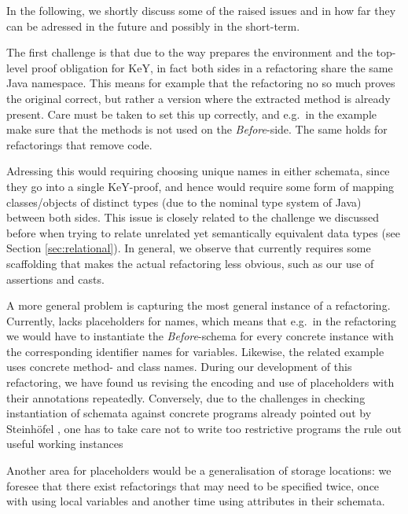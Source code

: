 In the following, we shortly discuss some of the raised issues and in how far they can be adressed in the future and possibly in the short-term.

The first challenge is that due to the way \Refinity{} prepares the environment and the top-level proof obligation for KeY,
in fact both sides in a refactoring share the same Java namespace.
This means for example that the  refactoring no so much proves the original correct, but rather a version where the extracted method is already present.
Care must be taken to set this up correctly, and e.g.\ in the  example make sure that the methods is not used on the \textit{Before}-side.
The same holds for refactorings that remove code.

Adressing this would requiring choosing unique names in either schemata, since they go into a single KeY-proof, and hence would require some form of mapping classes/objects of distinct types (due to the nominal type system of Java) between both sides.
This issue is closely related to the challenge we discussed before when trying to relate unrelated yet semantically equivalent data types (see Section \ref{sec:relational}).
In general, we observe that currently \Refinity{} requires some scaffolding that makes the actual refactoring less obvious,
such as our use of assertions and casts.

A more general problem is capturing the most general instance of a refactoring.
Currently, \Refinity{} lacks placeholders for names, which means that e.g.\ in the  refactoring we would have to instantiate the \textit{Before}-schema for every concrete instance with the corresponding identifier names for variables.
Likewise, the related  example uses concrete method- and class names.
During our development of this refactoring, we have found us revising the encoding and use of placeholders with their annotations repeatedly.
Conversely, due to the challenges in checking instantiation of schemata against concrete programs already pointed out by Steinhöfel \cite{steinhoefel-20},
one has to take care not to write too restrictive programs the rule out useful working instances

Another area for placeholders would be a generalisation of storage locations:
we foresee that there exist refactorings that may need to be specified twice, once with using local variables and another time using attributes in their schemata.

